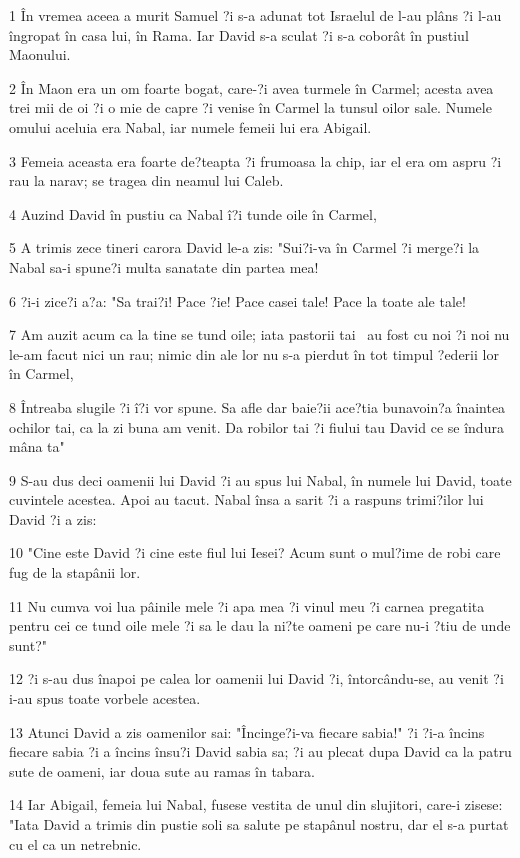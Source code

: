 \par 1 În vremea aceea a murit Samuel ?i s-a adunat tot Israelul de l-au plâns ?i l-au îngropat în casa lui, în Rama. Iar David s-a sculat ?i s-a coborât în pustiul Maonului.
\par 2 În Maon era un om foarte bogat, care-?i avea turmele în Carmel; acesta avea trei mii de oi ?i o mie de capre ?i venise în Carmel la tunsul oilor sale. Numele omului aceluia era Nabal, iar numele femeii lui era Abigail.
\par 3 Femeia aceasta era foarte de?teapta ?i frumoasa la chip, iar el era om aspru ?i rau la narav; se tragea din neamul lui Caleb.
\par 4 Auzind David în pustiu ca Nabal î?i tunde oile în Carmel,
\par 5 A trimis zece tineri carora David le-a zis: "Sui?i-va în Carmel ?i merge?i la Nabal sa-i spune?i multa sanatate din partea mea!
\par 6 ?i-i zice?i a?a: "Sa trai?i! Pace ?ie! Pace casei tale! Pace la toate ale tale!
\par 7 Am auzit acum ca la tine se tund oile; iata pastorii tai  au fost cu noi ?i noi nu le-am facut nici un rau; nimic din ale lor nu s-a pierdut în tot timpul ?ederii lor în Carmel,
\par 8 Întreaba slugile ?i î?i vor spune. Sa afle dar baie?ii ace?tia bunavoin?a înaintea ochilor tai, ca la zi buna am venit. Da robilor tai ?i fiului tau David ce se îndura mâna ta"
\par 9 S-au dus deci oamenii lui David ?i au spus lui Nabal, în numele lui David, toate cuvintele acestea. Apoi au tacut. Nabal însa a sarit ?i a raspuns trimi?ilor lui David ?i a zis:
\par 10 "Cine este David ?i cine este fiul lui Iesei? Acum sunt o mul?ime de robi care fug de la stapânii lor.
\par 11 Nu cumva voi lua pâinile mele ?i apa mea ?i vinul meu ?i carnea pregatita pentru cei ce tund oile mele ?i sa le dau la ni?te oameni pe care nu-i ?tiu de unde sunt?"
\par 12 ?i s-au dus înapoi pe calea lor oamenii lui David ?i, întorcându-se, au venit ?i i-au spus toate vorbele acestea.
\par 13 Atunci David a zis oamenilor sai: "Încinge?i-va fiecare sabia!" ?i ?i-a încins fiecare sabia ?i a încins însu?i David sabia sa; ?i au plecat dupa David ca la patru sute de oameni, iar doua sute au ramas în tabara.
\par 14 Iar Abigail, femeia lui Nabal, fusese vestita de unul din slujitori, care-i zisese: "Iata David a trimis din pustie soli sa salute pe stapânul nostru, dar el s-a purtat cu el ca un netrebnic.
